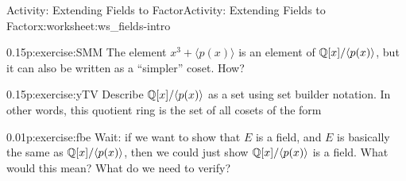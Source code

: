 \documentclass[11pt]{book}
\begin{document}
\begin{worksheet-subsection-numberless}{Activity: Extending Fields to Factor}{}{Activity: Extending Fields to Factor}{}{}{x:worksheet:ws_fields-intro}
\begin{divisionexercise}{7}{}{0.15}{p:exercise:SMM}
The element \(x^3+\langle p(x) \rangle\) is an element of \(\mathbb{Q}[x]/\langle p(x) \rangle\), but it can also be written as a ``simpler'' coset.  How?%
\end{divisionexercise}%
\begin{divisionexercise}{8}{}{0.15}{p:exercise:yTV}%
Describe \(\mathbb{Q}[x]/\langle p(x) \rangle\) as a set using set builder notation.  In other words, this quotient ring is the set of all cosets of the form \textellipsis{}%
\end{divisionexercise}%
\begin{divisionexercise}{9}{}{0.01}{p:exercise:fbe}%
Wait: if we want to show that \(E\) is a field, and \(E\) is basically the same as \(\mathbb{Q}[x]/\langle p(x) \rangle\), then we could just show \(\mathbb{Q}[x]/\langle p(x) \rangle\) is a field.  What would this mean?  What do we need to verify?%
\end{divisionexercise}%
\end{worksheet-subsection-numberless}
\restoregeometry
\end{document}
